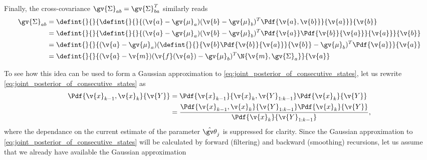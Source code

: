 Finally, the cross-covariance $\gv{\Sigma}_{ab}=\gv{\Sigma}_{ba}^T$ similarly reads
\begin{align}
	\gv{\Sigma}_{ab}&=\defint{}{}{\defint{}{}{(\v{a}-\gv{\mu}_a)(\v{b}-\gv{\mu}_b)^T\Pdf{\v{a},\v{b}}}{\v{a}}}{\v{b}} \nonumber\\
	&=\defint{}{}{\defint{}{}{(\v{a}-\gv{\mu}_a)(\v{b}-\gv{\mu}_b)^T\Pdf{\v{a}}\Pdf{\v{b}}{\v{a}}}{\v{a}}}{\v{b}} \nonumber\\
	&=\defint{}{}{(\v{a}-\gv{\mu}_a)(\defint{}{}{\v{b}\Pdf{\v{b}}{\v{a}}}{\v{b}}-\gv{\mu}_b)^T\Pdf{\v{a}}}{\v{a}} \nonumber\\
	&=\defint{}{}{(\v{a}-\v{m})(\v{f}(\v{a})-\gv{\mu}_b)^T\N{\v{m},\gv{\Sigma}_a}}{\v{a}}\label{eq:cross_cov_int}
\end{align}


 
To see how this idea can be used to form a Gaussian
approximation to \eqref{eq:joint_posterior_of_consecutive_states}, let us
rewrite \eqref{eq:joint_posterior_of_consecutive_states} as
\begin{align}
\begin{split}
	\Pdf{\v{x}_{k-1},\v{x}_{k}}{\v{Y}}&=\Pdf{\v{x}_{k-1}}{\v{x}_{k},\v{Y}_{1:k-1}}\Pdf{\v{x}_{k}}{\v{Y}}\\
	&=\frac{\Pdf{\v{x}_{k-1},\v{x}_{k}}{\v{Y}_{1:k-1}}\Pdf{\v{x}_{k}}{\v{Y}}}{\Pdf{\v{x}_{k}}{\v{Y}_{1:k-1}}},
	\label{eq:joint_smooth}
\end{split}
\end{align}
where the dependance on the current estimate of the parameter $\hat{\Th}_j$
is suppressed for clarity. Since the Gaussian approximation to
\eqref{eq:joint_posterior_of_consecutive_states} will be calculated by forward
(filtering) and backward (smoothing) recursions, let us assume that we already
have available the Gaussian approximation

